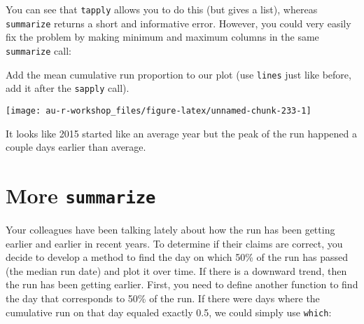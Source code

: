 \documentclass[]{book}
\newenvironment{Shaded}{\begin{snugshade}}{\end{snugshade}}
\newcommand{\KeywordTok}[1]{\textcolor[rgb]{0.13,0.29,0.53}{\textbf{#1}}}
\newcommand{\DataTypeTok}[1]{\textcolor[rgb]{0.13,0.29,0.53}{#1}}
\newcommand{\FloatTok}[1]{\textcolor[rgb]{0.00,0.00,0.81}{#1}}
\newcommand{\StringTok}[1]{\textcolor[rgb]{0.31,0.60,0.02}{#1}}
\newcommand{\OperatorTok}[1]{\textcolor[rgb]{0.81,0.36,0.00}{\textbf{#1}}}
\newcommand{\NormalTok}[1]{#1}
\theoremstyle{definition}
\theoremstyle{definition}
\theoremstyle{definition}
\theoremstyle{remark}
\begin{document}
You can see that \texttt{tapply} allows you to do this (but gives a
list), whereas \texttt{summarize} returns a short and informative error.
However, you could very easily fix the problem by making minimum and
maximum columns in the same \texttt{summarize} call:

\begin{Shaded}
\end{Shaded}

Add the mean cumulative run proportion to our plot (use \texttt{lines}
just like before, add it after the \texttt{sapply} call).

\begin{center}\texttt{[image: au-r-workshop\_files/figure-latex/unnamed-chunk-233-1]} \end{center}

It looks like 2015 started like an average year but the peak of the run
happened a couple days earlier than average.

\section{\texorpdfstring{More
\texttt{summarize}}{More summarize}}\label{more-summarize}

Your colleagues have been talking lately about how the run has been
getting earlier and earlier in recent years. To determine if their
claims are correct, you decide to develop a method to find the day on
which 50\% of the run has passed (the median run date) and plot it over
time. If there is a downward trend, then the run has been getting
earlier. First, you need to define another function to find the day that
corresponds to 50\% of the run. If there were days where the cumulative
run on that day equaled exactly 0.5, we could simply use \texttt{which}:

\begin{Shaded}
\end{Shaded}
\end{document}
